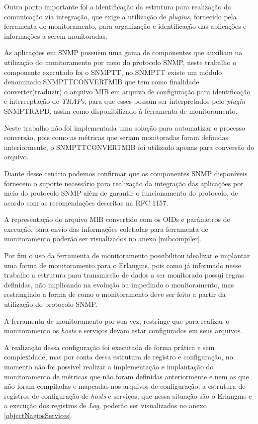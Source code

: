 Outro ponto importante foi a identificação da estrutura para realização da comunicação via integração, que exige a utilização de \textit{plugins}, fornecido pela ferramenta de monitoramento, para organização e identificação das aplicações e informações a serem monitoradas. 

As aplicações em \acrshort{SNMP} possuem uma gama de componentes que auxiliam na utilização do monitoramento por meio do protocolo \acrshort{SNMP}, neste trabalho o componente executado foi o SNMPTT, no SNMPTT existe um módulo denominado SNMPTTCONVERTMIB que tem como finalidade converter(traduzir) o arquivo MIB em arquivo de configuração para identificação e interceptação de \textit{TRAPs}, para que esses possam ser interpretados pelo \textit{plugin} SNMPTRAPD, assim como disponibilizado à ferramenta de monitoramento. 

Neste trabalho não foi implementada uma solução para automatizar o processo conversão, pois como as métricas que seriam monitoradas foram definidas anteriormente, o SNMPTTCONVERTMIB foi utilizado apenas para conversão do arquivo.

Diante desse cenário podemos confirmar que os componentes \acrshort{SNMP} disponíveis fornecem o suporte necessário para realização da integração das aplicações por meio do protocolo \acrshort{SNMP} além de garantir o funcionamento do protocolo, de acordo com as recomendações descritas na \acrshort{RFC} 1157. 

A representação do arquivo MIB convertido com os \acrshort{OID}s e parâmetros de execução, para envio das informações coletadas para ferramenta de monitoramento poderão ser visualizados no anexo \ref{mibcompiler}.     


Por fim o uso da ferramenta de monitoramento possibilitou idealizar e implantar uma forma de monitoramento para o Erlangms, pois como já informado nesse trabalho a estrutura para transmissão de dados a ser monitorado possui regras definidas, não implicando na evolução ou impedindo o monitoramento, mas restringindo a forma de como o monitoramento deve ser feito a partir da utilização do protocolo \acrshort{SNMP}. 

A ferramenta de monitoramento por sua vez, restringe que para realizar o monitoramento os \textit{hosts} e serviços devam estar configurados em seus arquivos. 

A realização dessa configuração foi executada de forma prática e sem complexidade, mas por conta dessa estrutura de registro e configuração, no momento não foi possível realizar a implementação e implantação do monitoramento de métricas que não foram definidas anteriormente e nem as que não foram compiladas e mapeadas nos arquivos de configuração, a estrutura de registros de configuração de \textit{hosts} e serviços, que nessa situação são o Erlangms e a execução dos registros de \textit{Log}, poderão ser visualizados no anexo \ref{objectNagiosServices}.

